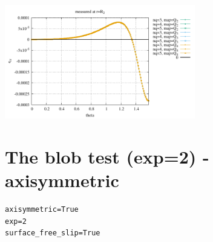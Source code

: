 \begin{center}
\includegraphics[width=8.3cm]{python_codes/fieldstone_152/results/exp2/err_R2}\\
\end{center}

\newpage
\section*{The blob test (exp=2) - axisymmetric}

\begin{lstlisting}
axisymmetric=True
exp=2
surface_free_slip=True
\end{lstlisting}

